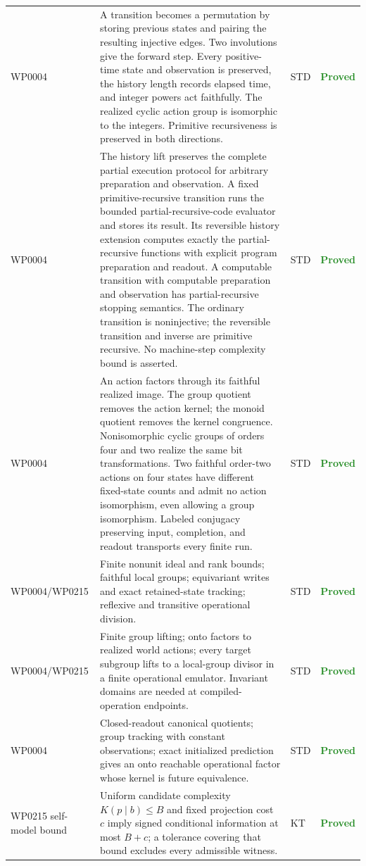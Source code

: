 \documentclass[11pt,a4paper]{article}
\newcommand{\stproved}{\textcolor{ForestGreen}{\textbf{Proved}}}
\begin{document}
{\begin{longtable}{@{}p{2.1cm}p{6.6cm}p{1.0cm}p{2.6cm}@{}}
WP0004 & A transition becomes a permutation by storing previous states and pairing the resulting injective edges. Two involutions give the forward step. Every positive-time state and observation is preserved, the history length records elapsed time, and integer powers act faithfully. The realized cyclic action group is isomorphic to the integers. Primitive recursiveness is preserved in both directions. & STD & \stproved \\
WP0004 & The history lift preserves the complete partial execution protocol for arbitrary preparation and observation. A fixed primitive-recursive transition runs the bounded partial-recursive-code evaluator and stores its result. Its reversible history extension computes exactly the partial-recursive functions with explicit program preparation and readout. A computable transition with computable preparation and observation has partial-recursive stopping semantics. The ordinary transition is noninjective; the reversible transition and inverse are primitive recursive. No machine-step complexity bound is asserted. & STD & \stproved \\
WP0004 & An action factors through its faithful realized image. The group quotient removes the action kernel; the monoid quotient removes the kernel congruence. Nonisomorphic cyclic groups of orders four and two realize the same bit transformations. Two faithful order-two actions on four states have different fixed-state counts and admit no action isomorphism, even allowing a group isomorphism. Labeled conjugacy preserving input, completion, and readout transports every finite run. & STD & \stproved \\
WP0004/WP0215 & Finite nonunit ideal and rank bounds; faithful local groups; equivariant writes and exact retained-state tracking; reflexive and transitive operational division. & STD & \stproved \\
WP0004/WP0215 & Finite group lifting; onto factors to realized world actions; every target subgroup lifts to a local-group divisor in a finite operational emulator. Invariant domains are needed at compiled-operation endpoints. & STD & \stproved \\
WP0004 & Closed-readout canonical quotients; group tracking with constant observations; exact initialized prediction gives an onto reachable operational factor whose kernel is future equivalence. & STD & \stproved \\
WP0215 self-model bound & Uniform candidate complexity $K(p\mid b)\le B$ and fixed projection cost $c$ imply signed conditional information at most $B+c$; a tolerance covering that bound excludes every admissible witness. & KT & \stproved \\

\end{longtable}}
\end{document}

